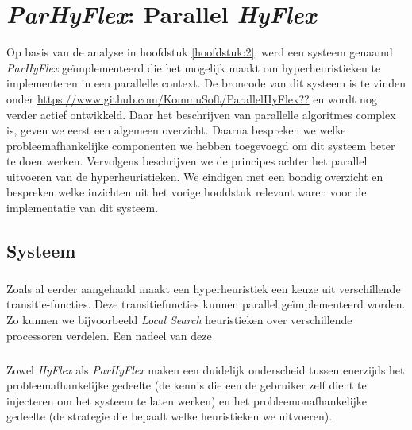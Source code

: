 \chapter{\emph{ParHyFlex}: Parallel \emph{HyFlex}}
\label{hoofdstuk:3}


Op basis van de analyse in hoofdstuk \ref{hoofdstuk:2}, werd een systeem genaamd \emph{ParHyFlex} ge\"implementeerd die het mogelijk maakt om hyperheuristieken te implementeren in een parallelle context. De broncode van dit systeem is te vinden onder \url{https://www.github.com/KommuSoft/ParallelHyFlex??} en wordt nog verder actief ontwikkeld. Daar het beschrijven van parallelle algoritmes complex is, geven we eerst een algemeen overzicht. Daarna bespreken we welke probleemafhankelijke componenten we hebben toegevoegd om dit systeem beter te doen werken. Vervolgens beschrijven we de principes achter het parallel uitvoeren van de hyperheuristieken. We eindigen met een bondig overzicht en bespreken welke inzichten uit het vorige hoofdstuk relevant waren voor de implementatie van dit systeem.

\section{Systeem}

\paragraph{}
Zoals al eerder aangehaald maakt een hyperheuristiek een keuze uit verschillende transitie-functies. Deze transitiefuncties kunnen parallel ge\"implementeerd worden. Zo kunnen we bijvoorbeeld \emph{Local Search} heuristieken over verschillende processoren verdelen. Een nadeel van deze %

\paragraph{}
Zowel \emph{HyFlex} als \emph{ParHyFlex} maken een duidelijk onderscheid tussen enerzijds het probleemafhankelijke gedeelte (de kennis die een de gebruiker zelf dient te injecteren om het systeem te laten werken) en het probleemonafhankelijke gedeelte (de strategie die bepaalt welke heuristieken we uitvoeren).

